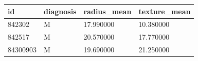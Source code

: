 \begin{tabular}{p{1cm}p{1.5cm}p{2cm}p{2cm}}
\toprule
id & diagnosis & radius\_mean & texture\_mean \\
\midrule
842302 & M & 17.990000 & 10.380000 \\
842517 & M & 20.570000 & 17.770000 \\
84300903 & M & 19.690000 & 21.250000 \\
\bottomrule
\end{tabular} 